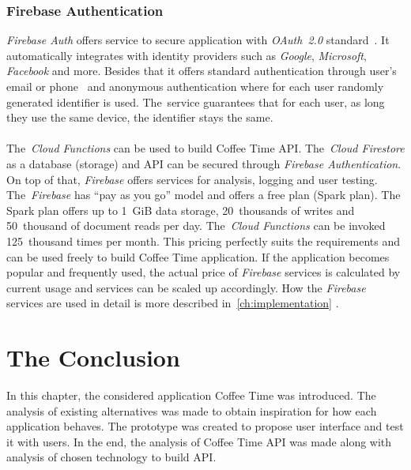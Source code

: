 \subsubsection{Firebase Authentication}
\textit{Firebase Auth} offers service to secure application with \textit{OAuth~2.0} standard~\cite{oauth}. It automatically integrates with identity providers such as \textit{Google}, \textit{Microsoft}, \textit{Facebook} and more. Besides that it offers standard authentication through user's email or phone~\cite{cloud-auth} and anonymous authentication where for each user randomly generated identifier is used. The~service guarantees that for each user, as long they use the same device, the identifier stays the same. 
\\
\\
The~\textit{Cloud Functions} can be used to build Coffee Time API. The~\textit{Cloud Firestore} as a database (storage) and API can be secured through \textit{Firebase Authentication}. On top of that, \textit{Firebase} offers services for analysis, logging and user testing. The~\textit{Firebase} has ``pay as you go'' model and offers a free plan (Spark plan). The Spark plan offers up to 1~GiB data storage, 20~thousands of writes and 50~thousand of document reads per day. The~\textit{Cloud Functions} can be invoked 125~thousand times per month. This pricing perfectly suits the requirements and can be used freely to build Coffee Time application. If the application becomes popular and frequently used, the actual price of \textit{Firebase} services is calculated by current usage and services can be scaled up accordingly. How the \textit{Firebase} services are used in detail is more described in~\cref{ch:implementation} . 

\section{The Conclusion}
In this chapter, the considered application Coffee Time was introduced. The analysis of existing alternatives was made to obtain inspiration for how each application behaves. The prototype was created to propose user interface and test it with users. In the end, the analysis of Coffee Time API was made along with analysis of chosen technology to build API.



